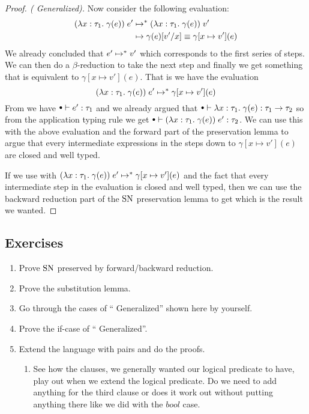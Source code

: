 \begin{proof}[Proof. ( Generalized)]
Now consider the following evaluation:
\begin{align*}
  (\lambda x : \tau_1 . \; \gamma(e)) \; e' & \mapsto^{*} (\lambda x : \tau_1 . \; \gamma(e)) \; v' \\
                                       & \mapsto \gamma(e)[v'/x] \equiv 
                                                   \gamma[x \mapsto v'](e)
\end{align*}
We already concluded that $e' \mapsto^{*} v'$ which corresponds to the first series of steps. We can then do a $\beta$-reduction to take the next step and finally we get something that is equivalent to $\gamma[x \mapsto v'](e)$. That is we have the evaluation
\[
(\lambda x : \tau_1 . \; \gamma(e)) \; e' \mapsto^{*} \gamma[x \mapsto v'](e)
\]
From  we have $\mtenv \vdash e' : \tau_1$ and we already argued that $\mtenv \vdash \tlabs{x}{\tau_1}{\gamma(e)} : \tarrow{\tau_1}{\tau_2}$ so from the application typing rule we get $\mtenv \vdash (\tlabs{x}{\tau_1}{\gamma(e)}) \; e' : \tau_2$. We can use this with the above evaluation and the forward part of the preservation lemma to argue that every intermediate expressions in the steps down to $\gamma[x \mapsto v'](e)$ are closed and well typed.

If we use  with $(\lambda x : \tau_1 . \; \gamma(e)) \; e' \mapsto^{*} \gamma[x \mapsto v'](e)$ and the fact that every intermediate step in the evaluation is closed and well typed, then we can use the backward reduction part of the $\operatorname{SN}$ preservation lemma to get  which is the result we wanted.

\end{proof}
\subsection*{Exercises}
\begin{enumerate}
\item Prove $\operatorname{SN}$ preserved by forward/backward reduction.
\item Prove the substitution lemma.
\item Go through the cases of `` Generalized'' shown here by yourself.
\item Prove the if-case of `` Generalized''.
\item Extend the language with pairs and do the proofs. 
  \begin{enumerate}
  \item See how the clauses, we generally wanted our logical predicate to have, play out when we extend the logical predicate. Do we need to add anything for the third clause or does it work out without putting anything there like we did with the $bool$ case.
  \end{enumerate}
\end{enumerate}
\clearpage
